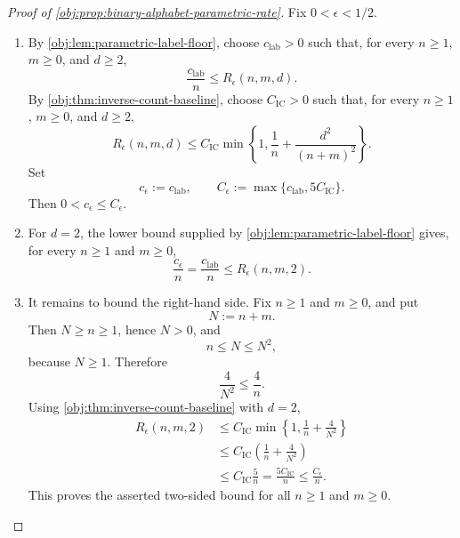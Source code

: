 \documentclass[11pt]{article}
\begin{document}
\begin{proof}[Proof of \cref{obj:prop:binary-alphabet-parametric-rate}]
Fix \(0<\epsilon<1/2\).
\begin{enumerate}
\item By \cref{obj:lem:parametric-label-floor}, choose \(c_{\mathrm{lab}}>0\) such that, for every \(n\ge1\), \(m\ge0\), and \(d\ge2\),
\[
\frac{c_{\mathrm{lab}}}{n}\le R_\epsilon(n,m,d).
\]
By \cref{obj:thm:inverse-count-baseline}, choose \(C_{\mathrm{IC}}>0\) such that, for every \(n\ge1\), \(m\ge0\), and \(d\ge2\),
\[
R_\epsilon(n,m,d)
\le
C_{\mathrm{IC}}
\min\left\{
1,\frac1n+\frac{d^2}{(n+m)^2}
\right\}.
\]
Set
\[
c_\epsilon:=c_{\mathrm{lab}},
\qquad
C_\epsilon:=\max\{c_{\mathrm{lab}},5C_{\mathrm{IC}}\}.
\]
Then \(0<c_\epsilon\le C_\epsilon\). %

\item For \(d=2\), the lower bound supplied by \cref{obj:lem:parametric-label-floor} gives, for every \(n\ge1\) and \(m\ge0\),
\[
\frac{c_\epsilon}{n}
=
\frac{c_{\mathrm{lab}}}{n}
\le
R_\epsilon(n,m,2).
\]

\item It remains to bound the right-hand side.  Fix \(n\ge1\) and \(m\ge0\), and put
\[
N:=n+m .
\]
Then \(N\ge n\ge1\), hence \(N>0\), and
\[
n\le N\le N^2,
\]
because \(N\ge1\).  Therefore
\[
\frac{4}{N^2}\le \frac4n .
\]
Using \cref{obj:thm:inverse-count-baseline} with \(d=2\),
\[
\begin{aligned}
R_\epsilon(n,m,2)
&\le
C_{\mathrm{IC}}
\min\left\{
1,\frac1n+\frac{4}{N^2}
\right\} \\
&\le
C_{\mathrm{IC}}
\left(\frac1n+\frac{4}{N^2}\right) \\
&\le
C_{\mathrm{IC}}\frac5n
=
\frac{5C_{\mathrm{IC}}}{n}
\le
\frac{C_\epsilon}{n}.
\end{aligned}
\]
This proves the asserted two-sided bound for all \(n\ge1\) and \(m\ge0\). %
\end{enumerate}
\end{proof}




\end{document}
